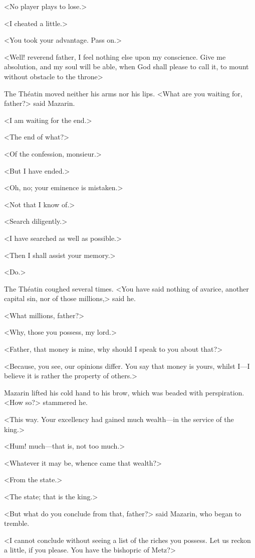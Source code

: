 <No player plays to lose.>

<I cheated a little.>

<You took your advantage. Pass on.>

<Well! reverend father, I feel nothing else upon my conscience. Give me absolution, and my soul will be able, when God shall please to call it, to mount without obstacle to the throne\longdash>

The Théatin moved neither his arms nor his lips. <What are you waiting for, father?> said Mazarin.

<I am waiting for the end.>

<The end of what?>

<Of the confession, monsieur.>

<But I have ended.>

<Oh, no; your eminence is mistaken.>

<Not that I know of.>

<Search diligently.>

<I have searched as well as possible.>

<Then I shall assist your memory.>

<Do.>

The Théatin coughed several times. <You have said nothing of avarice, another capital sin, nor of those millions,> said he.

<What millions, father?>

<Why, those you possess, my lord.>

<Father, that money is mine, why should I speak to you about that?>

<Because, you see, our opinions differ. You say that money is yours, whilst I—I believe it is rather the property of others.>

Mazarin lifted his cold hand to his brow, which was beaded with perspiration. <How so?> stammered he.

<This way. Your excellency had gained much wealth—in the service of the king.>

<Hum! much—that is, not too much.>

<Whatever it may be, whence came that wealth?>

<From the state.>

<The state; that is the king.>

<But what do you conclude from that, father?> said Mazarin, who began to tremble.

<I cannot conclude without seeing a list of the riches you possess. Let us reckon a little, if you please. You have the bishopric of Metz?>

